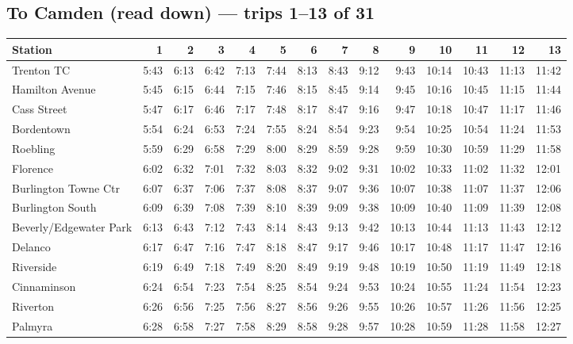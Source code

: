 \subsection*{To Camden (read down) --- trips 1--13 of 31}
\begin{center}\footnotesize\setlength{\tabcolsep}{3pt}\begin{tabular}{@{}lrrrrrrrrrrrrr@{}}\toprule
Station & 1 & 2 & 3 & 4 & 5 & 6 & 7 & 8 & 9 & 10 & 11 & 12 & 13 \\\midrule
Trenton TC & 5:43 & 6:13 & 6:42 & 7:13 & 7:44 & 8:13 & 8:43 & 9:12 & 9:43 & 10:14 & 10:43 & 11:13 & 11:42 \\
Hamilton Avenue & 5:45 & 6:15 & 6:44 & 7:15 & 7:46 & 8:15 & 8:45 & 9:14 & 9:45 & 10:16 & 10:45 & 11:15 & 11:44 \\
Cass Street & 5:47 & 6:17 & 6:46 & 7:17 & 7:48 & 8:17 & 8:47 & 9:16 & 9:47 & 10:18 & 10:47 & 11:17 & 11:46 \\
Bordentown & 5:54 & 6:24 & 6:53 & 7:24 & 7:55 & 8:24 & 8:54 & 9:23 & 9:54 & 10:25 & 10:54 & 11:24 & 11:53 \\
Roebling & 5:59 & 6:29 & 6:58 & 7:29 & 8:00 & 8:29 & 8:59 & 9:28 & 9:59 & 10:30 & 10:59 & 11:29 & 11:58 \\
Florence & 6:02 & 6:32 & 7:01 & 7:32 & 8:03 & 8:32 & 9:02 & 9:31 & 10:02 & 10:33 & 11:02 & 11:32 & 12:01 \\
Burlington Towne Ctr & 6:07 & 6:37 & 7:06 & 7:37 & 8:08 & 8:37 & 9:07 & 9:36 & 10:07 & 10:38 & 11:07 & 11:37 & 12:06 \\
Burlington South & 6:09 & 6:39 & 7:08 & 7:39 & 8:10 & 8:39 & 9:09 & 9:38 & 10:09 & 10:40 & 11:09 & 11:39 & 12:08 \\
Beverly/Edgewater Park & 6:13 & 6:43 & 7:12 & 7:43 & 8:14 & 8:43 & 9:13 & 9:42 & 10:13 & 10:44 & 11:13 & 11:43 & 12:12 \\
Delanco & 6:17 & 6:47 & 7:16 & 7:47 & 8:18 & 8:47 & 9:17 & 9:46 & 10:17 & 10:48 & 11:17 & 11:47 & 12:16 \\
Riverside & 6:19 & 6:49 & 7:18 & 7:49 & 8:20 & 8:49 & 9:19 & 9:48 & 10:19 & 10:50 & 11:19 & 11:49 & 12:18 \\
Cinnaminson & 6:24 & 6:54 & 7:23 & 7:54 & 8:25 & 8:54 & 9:24 & 9:53 & 10:24 & 10:55 & 11:24 & 11:54 & 12:23 \\
Riverton & 6:26 & 6:56 & 7:25 & 7:56 & 8:27 & 8:56 & 9:26 & 9:55 & 10:26 & 10:57 & 11:26 & 11:56 & 12:25 \\
Palmyra & 6:28 & 6:58 & 7:27 & 7:58 & 8:29 & 8:58 & 9:28 & 9:57 & 10:28 & 10:59 & 11:28 & 11:58 & 12:27 \\

\end{tabular}
\end{center}
